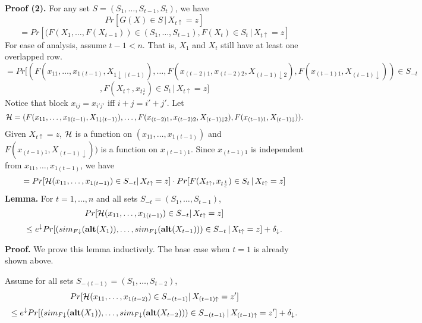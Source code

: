 \documentclass[11pt]{article}
\begin{document}
{\bf Proof (2). }
For any set $S=(S_{1}, \dots, S_{t-1}, S_{t})$, we have
\[
Pr[G(X) \in S\,|\, X_{t\uparrow} =z]
\]
\[
=Pr[(F(X_{1}, \dots, F(X_{t-1})) \in (S_{1},\dots , S_{t-1}), F(X_{t}) \in S_{t}\,|\, X_{t\uparrow} =z]
\]
For ease of analysis, assume $t-1<n$. That is, $X_{1}$ and $X_{t}$ still have at least one overlapped row. 
\[
=Pr[ (F(x_{11},\dots, x_{1(t-1)}, X_{1 \downarrow (t-1)}),  \dots,F(x_{(t-2)1}, x_{(t-2)2}, X_{(t-1)\downarrow 2}) , F(x_{(t-1)1}, X_{(t-1)\downarrow})) \in S_{-t}
\]
\[
, F(X_{t\uparrow}, x_{t \frac{1}{c}}) \in S_{t}\,|\, X_{t\uparrow} =z]
\]
Notice that block $x_{ij} = x_{i'j'}$ iff $i+j=i'+j'$. Let $${\cal H}=(F(x_{11},\dots,  x_{1(t-1)}, X_{1 \downarrow (t-1)}),   \dots,F(x_{(t-2)1}, x_{(t-2)2}, X_{(t-1)\downarrow 2}), F(x_{(t-1)1}, X_{(t-1)\downarrow})).$$ Given $X_{t\uparrow} =z$, $\cal H$ is a function on $(x_{11},\dots, x_{1(t-1)})$ and $F(x_{(t-1)1}, X_{(t-1)\downarrow}))$ is a function on $x_{(t-1)1}$. Since $x_{(t-1)1}$ is independent from $x_{11},\dots, x_{1(t-1)}$, we have
\[
=Pr[ {\cal H} (x_{11},\dots, x_{1(t-1)}) \in S_{-t} |\, X_{t\uparrow} =z] \cdot Pr [F(X_{t\uparrow}, x_{t \frac{1}{c}}) \in S_{t}\,|\, X_{t\uparrow} =z ] 
\]
{\bf Lemma. } For $t=1,\dots, n$ and all sets $S_{-t}=(S_{1}, \dots , S_{t-1})$,
\[Pr[{\cal H} (x_{11},\dots, x_{1(t-1)})  \in S_{-t} |\, X_{t\uparrow} =z ]\]
\[ \leq e^{\downarrow} Pr [(sim_{F\downarrow} ({\bf alt}(X_{1}) ), \dots, sim_{F\downarrow} ({\bf alt}(X_{t-1}))) \in S_{-t} \,|\, X_{t\uparrow} =z ] + \delta_{\downarrow}.\]

{\bf Proof. } We prove this lemma inductively. The base case when $t=1$ is already shown above. 

Assume for all sets $S_{-(t-1)}=(S_{1}, \dots , S_{t-2})$,
\[Pr[{\cal H} (x_{11},\dots, x_{1(t-2)})  \in S_{-(t-1)} |\, X_{(t-1)\uparrow} =z' ]\]
\[ \leq e^{\downarrow} Pr [(sim_{F\downarrow} ({\bf alt}(X_{1}) ), \dots, sim_{F\downarrow} ({\bf alt}(X_{t-2}))) \in S_{-(t-1)} \,|\, X_{(t-1)\uparrow} =z' ] + \delta_{\downarrow}.\]
\end{document}
